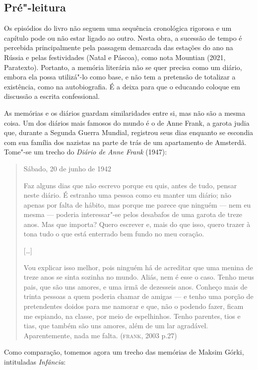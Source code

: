 \documentclass{article}
\begin{document}
\subsection{Pré"-leitura}

Os episódios do livro não seguem uma sequência cronológica rigorosa e
um capítulo pode ou não estar ligado ao outro. Nesta obra, a sucessão de
tempo é percebida principalmente pela passagem demarcada das estações do
ano na Rússia e pelas festividades (Natal e Páscoa), como nota Mountian
(2021, Paratexto). Portanto, a memória literária não se quer precisa
como um diário, embora ela possa utilizá"-lo como base, e não tem a
pretensão de totalizar a existência, como na autobiografia. É a deixa
para que o educando coloque em discussão a escrita confessional.

As memórias e os diários guardam similaridades entre si, mas não são a
mesma coisa. Um dos diários mais famosos do mundo é o de Anne Frank, a
garota judia que, durante a Segunda Guerra Mundial, registrou seus dias
enquanto se escondia com sua família dos nazistas na parte de trás de um
apartamento de Amsterdã. Tome"-se um trecho do \emph{Diário de Anne
Frank} (1947):

\begin{quote}
Sábado, 20 de junho de 1942

Faz alguns dias que não escrevo porque eu quis, antes de tudo, pensar
neste diário. É estranho uma pessoa como eu manter um diário; não apenas
por falta de hábito, mas porque me parece que ninguém --- nem eu mesma
--- poderia interessar"-se pelos desabafos de uma garota de treze anos.
Mas que importa? Quero escrever e, mais do que isso, quero trazer à tona
tudo o que está enterrado bem fundo no meu coração.

{[}\ldots{}{]}

Vou explicar isso melhor, pois ninguém há de acreditar que uma menina de
treze anos se sinta sozinha no mundo. Aliás, nem é esse o caso. Tenho
meus pais, que são uns amores, e uma irmã de dezesseis anos. Conheço
mais de trinta pessoas a quem poderia chamar de amigas --- e tenho uma
porção de pretendentes doidos para me namorar e que, não o podendo
fazer, ficam me espiando, na classe, por meio de espelhinhos. Tenho
parentes, tios e tias, que também são uns amores, além de um lar
agradável. Aparentemente, nada me falta. (\textsc{frank}, 2003 p.27)
\end{quote}

Como comparação, tomemos agora um trecho das memórias de Maksim Górki,
intituladas \emph{Infância}:
\end{document}
